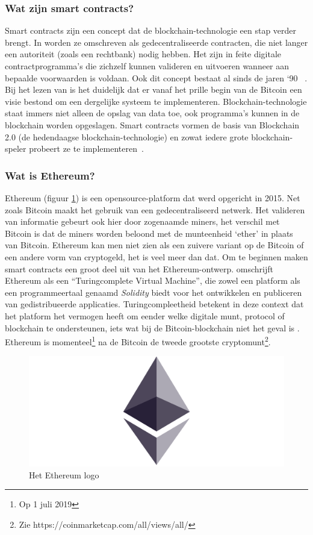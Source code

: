 		\subsubsection{Wat  zijn smart contracts?}
			Smart contracts zijn een concept dat de blockchain-technologie een stap verder brengt. In \textcite{Swan2015} worden ze omschreven als gedecentraliseerde contracten, die niet langer een autoriteit (zoals een rechtbank) nodig hebben. Het zijn in feite digitale contractprogramma’s die zichzelf kunnen valideren en uitvoeren wanneer aan bepaalde voorwaarden is voldaan. Ook dit concept bestaat al sinds de jaren `90 ~\autocite{Szabo1996}. Bij het lezen van \textcite{Nakamoto2008} is het duidelijk dat er vanaf het prille begin van de Bitcoin een visie bestond om een dergelijke systeem te implementeren. Blockchain-technologie staat immers niet alleen de opslag van data toe, ook programma’s kunnen in de blockchain worden opgeslagen. Smart contracts vormen de basis van Blockchain 2.0 (de hedendaagse blockchain-technologie) en zowat iedere grote blockchain-speler probeert ze te implementeren~\autocite{Swan2015}.
		\subsubsection{Wat is Ethereum?}
			Ethereum (figuur \ref{fig:ethereum}) is een opensource-platform dat werd opgericht in 2015. Net zoals Bitcoin maakt het gebruik van een gedecentraliseerd netwerk. Het valideren van informatie gebeurt ook hier door zogenaamde miners, het verschil met Bitcoin is dat de miners worden beloond met de munteenheid `ether' in plaats van Bitcoin. Ethereum kan men niet zien als een zuivere variant op de Bitcoin of een andere vorm van cryptogeld, het is veel meer dan dat. Om te beginnen maken smart contracts  een groot deel uit van het Ethereum-ontwerp. \textcite{Swan2015} omschrijft Ethereum als een ``Turingcomplete Virtual Machine”, die zowel een platform als een programmeertaal genaamd \textit{Solidity} biedt voor het ontwikkelen en publiceren van gedistribueerde applicaties. Turingcompleetheid betekent in deze context dat het platform het vermogen heeft om eender welke digitale munt, protocol of blockchain te ondersteunen, iets wat bij de Bitcoin-blockchain niet het geval is \autocite{Swan2015}. Ethereum is momenteel\footnote{Op 1 juli 2019} na de Bitcoin de tweede grootste cryptomunt\footnote{Zie https://coinmarketcap.com/all/views/all/}. 
			
			\begin{figure}
				\centering
				\includegraphics[width=\linewidth/2]{img/ethereum.png}
				\caption{Het Ethereum logo}
				\label{fig:ethereum}
			\end{figure}
			

